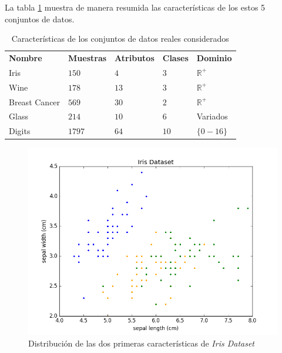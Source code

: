 La tabla \ref{tab:tabla7} muestra de manera resumida las características de los estos 5 conjuntos de datos.

\begin{table}[h]
	\centering
	\setlength{\arrayrulewidth}{1mm}
	\setlength{\tabcolsep}{10pt}
	\renewcommand{\arraystretch}{0.8}
	
	\begin{tabular}{ >{\centering\arraybackslash}m{2.5cm}  >{\centering\arraybackslash}m{1.5cm}>{\centering\arraybackslash}m{1.5cm}>{\centering\arraybackslash}m{1.5cm}>{\centering\arraybackslash}m{1.5cm}}
		\hline
		\rowcolor{black}
		\multicolumn{5}{c}{\bf \color{white}{Conjuntos de datos reales}}\\
		\hline
		\rowcolor{gray!50}
		\textbf{Nombre} & \textbf{Muestras} & \textbf{Atributos} & \textbf{Clases} & \textbf{Dominio} \\
		Iris & $150$ & $4$ & $3$ & $\mathbb{R}^+$ \\
		Wine & $178$ & $13$ & $3$ & $\mathbb{R}^+$ \\
		Breast Cancer & $569$ & $30$ & $2$ & $\mathbb{R}^+$ \\
		Glass & $214$ & $10$ & $6$ & Variados \\
		Digits & $1797$ & $64$ & $10$ & $\{0-16\}$ \\
		\hline
		
	\end{tabular}
	\caption{Características de los conjuntos de datos reales considerados}
	\label{tab:tabla7}
\end{table}

\begin{figure}[!h]
	\centering
	\includegraphics[scale=0.32]{imagenes/c6/IrisSet}
	\caption{Distribución de las dos primeras características de \textit{Iris Dataset}}\label{fig:figure27}
\end{figure}

